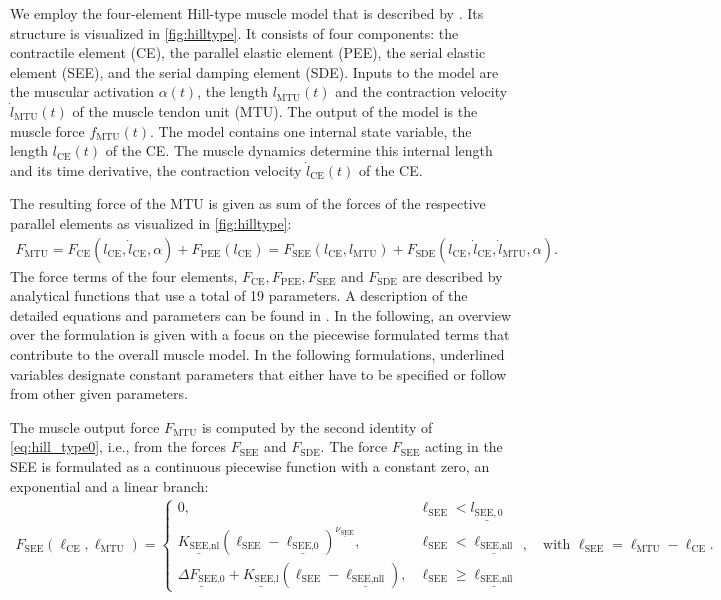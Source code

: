 \newcommand{\CE}{\text{CE}}
\newcommand{\MTU}{\text{MTU}}

We employ the four-element Hill-type muscle model that is described by \cite{Hilltype2014}. Its structure is visualized in \cref{fig:hilltype}. It consists of four components: the contractile element (CE), the parallel elastic element (PEE), the serial elastic element (SEE), and the serial damping element (SDE). Inputs to the model are the muscular activation $\alpha(t)$, the length $l_\MTU(t)$ and the contraction velocity $\dot{l}_\MTU(t)$ of the muscle tendon unit (MTU).
The output of the model is the muscle force $f_\text{MTU}(t)$. The model contains one internal state variable, the length $l_\text{CE}(t)$ of the CE. The muscle dynamics determine this internal length and its time derivative, the contraction velocity $\dot{l}_\text{CE}(t)$ of the CE.

The resulting force of the MTU is given as sum of the forces of the respective parallel elements as visualized in \cref{fig:hilltype}:
\begin{equation}\label{eq:hill_type0}
  \begin{array}{lll}
    F_\MTU = F_\CE(l_\CE, \dot{l}_\CE, \alpha) + F_\text{PEE}(l_\CE) = F_\text{SEE}(l_\CE,l_\MTU) + F_\text{SDE}(l_\CE,\dot{l}_\CE,\dot{l}_\MTU,\alpha).
  \end{array}
\end{equation}
The force terms of the four elements, $F_\CE, F_\text{PEE}, F_\text{SEE}$ and $F_\text{SDE}$ are described by analytical functions that use a total of 19 parameters. A description of the detailed equations and parameters can be found in \cite{Hilltype2014}. In the following, an overview over the formulation is given with a focus on the piecewise formulated terms that contribute to the overall muscle model. In the following formulations, underlined variables designate constant parameters that either have to be specified or follow from other given parameters.

The muscle output force $F_\text{MTU}$ is computed by the second identity of \cref{eq:hill_type0}, i.e., from the forces $F_\text{SEE}$ and $F_\text{SDE}$. The force $F_\text{SEE}$ acting in the SEE is formulated as a continuous piecewise function with a constant zero, an exponential and a linear branch:
\begin{equation*}
  \begin{array}{lll}
    F_\text{SEE}(\ell_\CE,\ell_\MTU) = \begin{cases}
      0, & \ell_\text{SEE} < \underline{l_{\text{SEE},0}}\\[2mm]
      \underline{K_\text{SEE,nl}}(\ell_\text{SEE} - \underline{\ell_\text{SEE,0}})^{\underline{\nu_\text{SEE}}}, & \ell_\text{SEE} < \underline{\ell_\text{SEE,nll}}\\[2mm]
    \underline{\Delta F_\text{SEE,0}} + \underline{K_\text{SEE,l}}(\ell_\text{SEE} - \underline{\ell_\text{SEE,nll}}), & 
    \ell_\text{SEE} \geq \underline{\ell_\text{SEE,nll}}
    \end{cases}, \quad \text{with } \ell_\text{SEE} = \ell_\MTU - \ell_\CE.
  \end{array}
\end{equation*}

